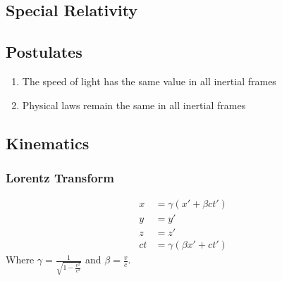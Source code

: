 \documentclass[11pt]{article}
\begin{document}
\begin{multicols*}{3}
\section{Special Relativity}
\subsection{Postulates}
\begin{enumerate}
\item The speed of light has the same value in all inertial frames
\item Physical laws remain the same in all inertial frames
\end{enumerate}
\subsection{Kinematics}
\subsubsection{Lorentz Transform}
\begin{align*}
  x&= \gamma (x' + \beta ct') \\
  y&=y' \\
  z&=z' \\
  ct&= \gamma (\beta x' + ct')
\end{align*}
Where $\gamma = \frac{1}{\sqrt{1-\frac{v^2}{c^2}}}$ and $\beta = \frac{v}{c}$.

\end{multicols*}
\end{document}
